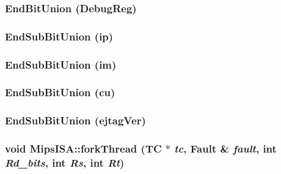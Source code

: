 \label{namespaceMipsISA_a8edb562d62f5bc109749bb5e5c51d9f1}
\hypertarget{namespaceMipsISA_a74e5941d61677e3e49c387d644b057cb}{
\subsubsection[{EndBitUnion}]{\setlength{\rightskip}{0pt plus 5cm}EndBitUnion (DebugReg)}}
\label{namespaceMipsISA_a74e5941d61677e3e49c387d644b057cb}
\hypertarget{namespaceMipsISA_acb2250639af71811d86378b81ff254b0}{
\subsubsection[{EndSubBitUnion}]{\setlength{\rightskip}{0pt plus 5cm}EndSubBitUnion (ip)}}
\label{namespaceMipsISA_acb2250639af71811d86378b81ff254b0}
\hypertarget{namespaceMipsISA_ac2fda487f43a314ab9a0da3bf8de9fb8}{
\subsubsection[{EndSubBitUnion}]{\setlength{\rightskip}{0pt plus 5cm}EndSubBitUnion (im)}}
\label{namespaceMipsISA_ac2fda487f43a314ab9a0da3bf8de9fb8}
\hypertarget{namespaceMipsISA_ab60686612b9e6fa8a4e99524f00655e0}{
\subsubsection[{EndSubBitUnion}]{\setlength{\rightskip}{0pt plus 5cm}EndSubBitUnion (cu)}}
\label{namespaceMipsISA_ab60686612b9e6fa8a4e99524f00655e0}
\hypertarget{namespaceMipsISA_ad1223c93dc1c573511a672beb68ed125}{
\subsubsection[{EndSubBitUnion}]{\setlength{\rightskip}{0pt plus 5cm}EndSubBitUnion (ejtagVer)}}
\label{namespaceMipsISA_ad1223c93dc1c573511a672beb68ed125}
\hypertarget{namespaceMipsISA_ac90786a66a67e08e3105a5b2f7e8e995}{
\subsubsection[{forkThread}]{\setlength{\rightskip}{0pt plus 5cm}void MipsISA::forkThread (TC $\ast$ {\em tc}, \/  {\bf Fault} \& {\em fault}, \/  int {\em Rd\_\-bits}, \/  int {\em Rs}, \/  int {\em Rt})}}
\label{namespaceMipsISA_ac90786a66a67e08e3105a5b2f7e8e995}



